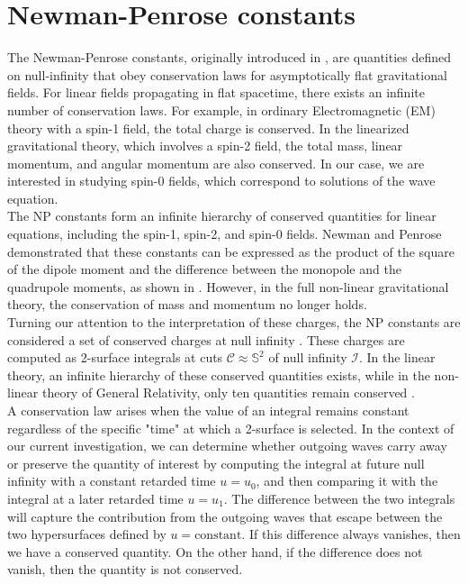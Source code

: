 \section{Newman-Penrose constants}
\label{section:Newman-Penrose Constants}
The Newman-Penrose constants, originally introduced in \cite{NewPen68}, are quantities defined on null-infinity that obey conservation laws for asymptotically flat gravitational fields. For linear fields propagating in flat spacetime, there exists an infinite number of conservation laws. For example, in ordinary Electromagnetic (EM) theory with a spin-1 field, the total charge is conserved. In the linearized gravitational theory, which involves a spin-2 field, the total mass, linear momentum, and angular momentum are also conserved. In our case, we are interested in studying spin-0 fields, which correspond to solutions of the wave equation.\\

The NP constants form an infinite hierarchy of conserved quantities for linear equations, including the spin-1, spin-2, and spin-0 fields. Newman and Penrose demonstrated that these constants can be expressed as the product of the square of the dipole moment and the difference between the monopole and the quadrupole moments, as shown in \cite{DaiVal02}. However, in the full non-linear gravitational theory, the conservation of mass and momentum no longer holds.\\

Turning our attention to the interpretation of these charges, the NP constants are considered a set of conserved charges at null infinity \cite{NewPen68}. These charges are computed as 2-surface integrals at cuts $\mathcal{C} \approx \mathbb{S}^2$ of null infinity $\mathscr{I}$. In the linear theory, an infinite hierarchy of these conserved quantities exists, while in the non-linear theory of General Relativity, only ten quantities remain conserved \cite{NewPen68}.\\

A conservation law arises when the value of an integral remains constant regardless of the specific "time" at which a 2-surface is selected. In the context of our current investigation, we can determine whether outgoing waves carry away or preserve the quantity of interest by computing the integral at future null infinity with a constant retarded time $u = u_0$, and then comparing it with the integral at a later retarded time $u = u_1$. The difference between the two integrals will capture the contribution from the outgoing waves that escape between the two hypersurfaces defined by $u = \text{constant}$. If this difference always vanishes, then we have a conserved quantity. On the other hand, if the difference does not vanish, then the quantity is not conserved.\\

